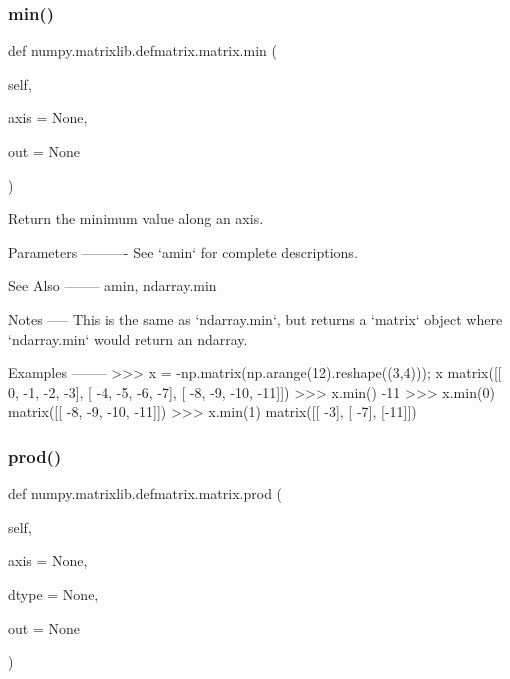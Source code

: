 \subsubsection{\texorpdfstring{min()}{min()}}
{\footnotesize\ttfamily def numpy.\+matrixlib.\+defmatrix.\+matrix.\+min (\begin{DoxyParamCaption}\item[{}]{self,  }\item[{}]{axis = {\ttfamily None},  }\item[{}]{out = {\ttfamily None} }\end{DoxyParamCaption})}

\begin{DoxyVerb}Return the minimum value along an axis.

Parameters
----------
See `amin` for complete descriptions.

See Also
--------
amin, ndarray.min

Notes
-----
This is the same as `ndarray.min`, but returns a `matrix` object
where `ndarray.min` would return an ndarray.

Examples
--------
>>> x = -np.matrix(np.arange(12).reshape((3,4))); x
matrix([[  0,  -1,  -2,  -3],
[ -4,  -5,  -6,  -7],
[ -8,  -9, -10, -11]])
>>> x.min()
-11
>>> x.min(0)
matrix([[ -8,  -9, -10, -11]])
>>> x.min(1)
matrix([[ -3],
[ -7],
[-11]])\end{DoxyVerb}
 \mbox{\label{classnumpy_1_1matrixlib_1_1defmatrix_1_1matrix_a535c299ae7a76c1193778f7664311be3}} 
\subsubsection{\texorpdfstring{prod()}{prod()}}
{\footnotesize\ttfamily def numpy.\+matrixlib.\+defmatrix.\+matrix.\+prod (\begin{DoxyParamCaption}\item[{}]{self,  }\item[{}]{axis = {\ttfamily None},  }\item[{}]{dtype = {\ttfamily None},  }\item[{}]{out = {\ttfamily None} }\end{DoxyParamCaption})}

